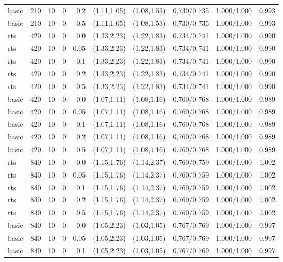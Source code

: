 \begin{tabular}{llrrrccccc}
basic & 210 & 10 & 0 & 0.2 & (1.11,1.05) & (1.08,1.53) & 0.730/0.735 & 1.000/1.000 & 0.993 \\
basic & 210 & 10 & 0 & 0.5 & (1.11,1.05) & (1.08,1.53) & 0.730/0.735 & 1.000/1.000 & 0.993 \\
rts & 420 & 10 & 0 & 0.0 & (1.33,2.23) & (1.22,1.83) & 0.734/0.741 & 1.000/1.000 & 0.990 \\
rts & 420 & 10 & 0 & 0.05 & (1.33,2.23) & (1.22,1.83) & 0.734/0.741 & 1.000/1.000 & 0.990 \\
rts & 420 & 10 & 0 & 0.1 & (1.33,2.23) & (1.22,1.83) & 0.734/0.741 & 1.000/1.000 & 0.990 \\
rts & 420 & 10 & 0 & 0.2 & (1.33,2.23) & (1.22,1.83) & 0.734/0.741 & 1.000/1.000 & 0.990 \\
rts & 420 & 10 & 0 & 0.5 & (1.33,2.23) & (1.22,1.83) & 0.734/0.741 & 1.000/1.000 & 0.990 \\
basic & 420 & 10 & 0 & 0.0 & (1.07,1.11) & (1.08,1.16) & 0.760/0.768 & 1.000/1.000 & 0.989 \\
basic & 420 & 10 & 0 & 0.05 & (1.07,1.11) & (1.08,1.16) & 0.760/0.768 & 1.000/1.000 & 0.989 \\
basic & 420 & 10 & 0 & 0.1 & (1.07,1.11) & (1.08,1.16) & 0.760/0.768 & 1.000/1.000 & 0.989 \\
basic & 420 & 10 & 0 & 0.2 & (1.07,1.11) & (1.08,1.16) & 0.760/0.768 & 1.000/1.000 & 0.989 \\
basic & 420 & 10 & 0 & 0.5 & (1.07,1.11) & (1.08,1.16) & 0.760/0.768 & 1.000/1.000 & 0.989 \\
rts & 840 & 10 & 0 & 0.0 & (1.15,1.76) & (1.14,2.37) & 0.760/0.759 & 1.000/1.000 & 1.002 \\
rts & 840 & 10 & 0 & 0.05 & (1.15,1.76) & (1.14,2.37) & 0.760/0.759 & 1.000/1.000 & 1.002 \\
rts & 840 & 10 & 0 & 0.1 & (1.15,1.76) & (1.14,2.37) & 0.760/0.759 & 1.000/1.000 & 1.002 \\
rts & 840 & 10 & 0 & 0.2 & (1.15,1.76) & (1.14,2.37) & 0.760/0.759 & 1.000/1.000 & 1.002 \\
rts & 840 & 10 & 0 & 0.5 & (1.15,1.76) & (1.14,2.37) & 0.760/0.759 & 1.000/1.000 & 1.002 \\
basic & 840 & 10 & 0 & 0.0 & (1.05,2.23) & (1.03,1.05) & 0.767/0.769 & 1.000/1.000 & 0.997 \\
basic & 840 & 10 & 0 & 0.05 & (1.05,2.23) & (1.03,1.05) & 0.767/0.769 & 1.000/1.000 & 0.997 \\
basic & 840 & 10 & 0 & 0.1 & (1.05,2.23) & (1.03,1.05) & 0.767/0.769 & 1.000/1.000 & 0.997 \\

\end{tabular}
